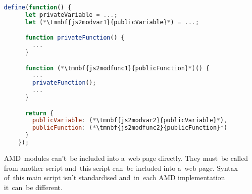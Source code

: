 \enlargethispage{10mm}
\begin{lstlisting}[language=JavaScript]
    define(function() {
      let privateVariable = ...;
      let (*\tmnbf{js2modvar1}{publicVariable}*) = ...;

      function privateFunction() {
        ...
      }

      function (*\tmnbf{js2modfunc1}{publicFunction}*)() {
        ...
        privateFunction();
        ...
      }

      return {
        publicVariable: (*\tmnbf{js2modvar2}{publicVariable}*),
        publicFunction: (*\tmnbf{js2modfunc2}{publicFunction}*)
      }
    });
\end{lstlisting}
\newpage

AMD~modules can't~be included into a~web page directly.
They must~be called from another script and~this script can~be included into a~web page.
Syntax of~this main script isn't standardised and~in~each AMD implementation it~can~be different.
